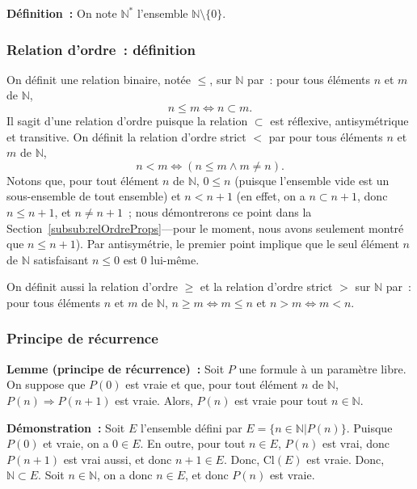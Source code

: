    \done 

\medskip

\noindent\textbf{Définition :} 
    On note $\mathbb{N}^*$ l'ensemble $\mathbb{N} \setminus \lbrace 0 \rbrace$.

\subsubsection{Relation d'ordre : définition}

On définit une relation binaire, notée $\leq$, sur $\mathbb{N}$ par : pour tous éléments $n$ et $m$ de $\mathbb{N}$, 
\begin{equation*}
    n \leq m \Leftrightarrow n \subset m .
\end{equation*}
Il sagit d'une relation d'ordre puisque la relation $\subset$ est réflexive, antisymétrique et transitive.
On définit la relation d'ordre strict $<$ par pour tous éléments $n$ et $m$ de $\mathbb{N}$, 
\begin{equation*}
    n < m \Leftrightarrow (n \leq m \wedge m \neq n).
\end{equation*}
Notons que, pour tout élément $n$ de $\mathbb{N}$, $0 \leq n$ (puisque l'ensemble vide est un sous-ensemble de tout ensemble) et $n < n+1$ (en effet, on a $n \subset n+1$, donc $n \leq n+1$, et $n \neq n+1$ ; nous démontrerons ce point dans la Section~\ref{subsub:relOrdreProps}—pour le moment, nous avons seulement montré que $n \leq n+1$). 
Par antisymétrie, le premier point implique que le seul élément $n$ de $\mathbb{N}$ satisfaisant $n \leq 0$ est $0$ lui-même.

On définit aussi la relation d'ordre $\geq$ et la relation d'ordre strict $>$ sur $\mathbb{N}$ par : pour tous éléments $n$ et $m$ de $\mathbb{N}$, $n \geq m \Leftrightarrow m \leq n$ et $n > m \Leftrightarrow m < n$.

\subsubsection{Principe de récurrence}
\label{subsub:recurrence}

\noindent\textbf{Lemme (principe de récurrence) :} Soit $P$ une formule à un paramètre libre. 
    On suppose que $P(0)$ est vraie et que, pour tout élément $n$ de $\mathbb{N}$, $P(n) \Rightarrow P(n+1)$ est vraie. 
    Alors, $P(n)$ est vraie pour tout $n \in \mathbb{N}$.

\medskip

\noindent\textbf{Démonstration :} Soit $E$ l'ensemble défini par $E = \lbrace n \in \mathbb{N} \vert P(n) \rbrace$. 
    Puisque $P(0)$ et vraie, on a $0 \in E$. 
    En outre, pour tout $n \in E$, $P(n)$ est vrai, donc $P(n+1)$ est vrai aussi, et donc $n+1 \in E$. 
    Donc, $\mathrm{Cl}(E)$ est vraie. 
    Donc, $\mathbb{N} \subset E$. 
    Soit $n \in \mathbb{N}$, on a donc $n \in E$, et donc $P(n)$ est vraie.

